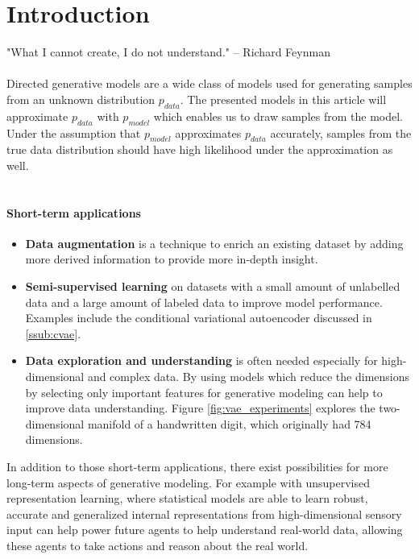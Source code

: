 \section{Introduction}
\label{sec:introduction}

"What I cannot create, I do not understand." -- Richard Feynman \\\\



Directed generative models are a wide class of models used for generating samples from an unknown distribution $p_{data}$.
The presented models in this article will approximate $p_{data}$ with $p_{model}$ which enables us to draw samples from the model.
Under the assumption that $p_{model}$ approximates $p_{data}$ accurately, samples from the true data distribution should have high likelihood under the approximation as well.\\\\


\paragraph{Short-term applications}
\begin{itemize}
  \item \textbf{Data augmentation} is a technique to enrich an existing dataset by adding more derived information to provide more in-depth insight.
  \item \textbf{Semi-supervised learning} on datasets with a small amount of unlabelled data and a large amount of labeled data to improve model performance. Examples include the conditional variational autoencoder discussed in \ref{ssub:cvae}.
  \item \textbf{Data exploration and understanding} is often needed especially for high-dimensional and complex data. By using models which reduce the dimensions by selecting only important features for generative modeling can help to improve data understanding. Figure \ref{fig:vae_experiments} explores the two-dimensional manifold of a handwritten digit, which originally had 784 dimensions.
\end{itemize}

In addition to those short-term applications, there exist possibilities for more long-term aspects of generative modeling.
For example with unsupervised representation learning, where statistical models are able to learn robust, accurate and generalized internal representations from high-dimensional sensory input can help power future agents to help understand real-world data, allowing these agents to take actions and reason about the real world.


